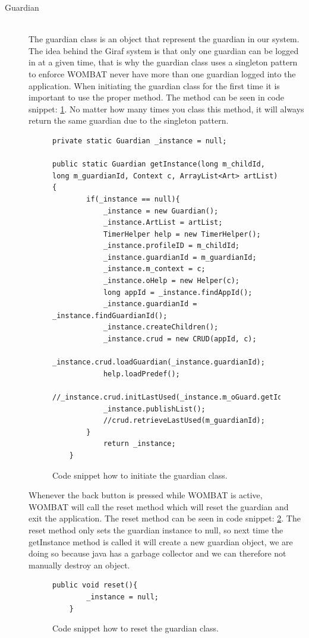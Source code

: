 \begin{description}
  \item[Guardian] \hfill \\
  The guardian class is an object that represent the guardian in our system. The idea behind the Giraf system is that only one guardian can be logged in at a given time, that is why the guardian class uses a singleton pattern to enforce WOMBAT never have more than one guardian logged into the application. When initiating the guardian class for the first time it is important to use the proper method. The method can be seen in code snippet: \ref{code:guardianinit}. No matter how many times you class this method, it will always return the same guardian due to the singleton pattern.
	
	\begin{figure}[H]
\begin{lstlisting}
private static Guardian _instance = null;

public static Guardian getInstance(long m_childId, long m_guardianId, Context c, ArrayList<Art> artList){
		if(_instance == null){
			_instance = new Guardian();
			_instance.ArtList = artList;
			TimerHelper help = new TimerHelper();
			_instance.profileID = m_childId;
			_instance.guardianId = m_guardianId;
			_instance.m_context = c;
			_instance.oHelp = new Helper(c);
			long appId = _instance.findAppId();
			_instance.guardianId = _instance.findGuardianId();
			_instance.createChildren();
			_instance.crud = new CRUD(appId, c);
			_instance.crud.loadGuardian(_instance.guardianId);
			help.loadPredef();
			//_instance.crud.initLastUsed(_instance.m_oGuard.getId());
			_instance.publishList();			
			//crud.retrieveLastUsed(m_guardianId);
		}
			return _instance;
	}
\end{lstlisting}
\caption{Code snippet how to initiate the guardian class.}%
\label{code:guardianinit}%
\end{figure}

Whenever the back button is pressed while WOMBAT is active, WOMBAT will call the reset method which will reset the guardian and exit the application. The reset method can be seen in code snippet: \ref{code:guardianreset}. The reset method only sets the guardian instance to null, so next time the getInstance method is called it will create a new guardian object, we are doing so because java has a garbage collector and we can therefore not manually destroy an object.
	
\begin{figure}[H]
\begin{lstlisting}
public void reset(){
		_instance = null;
	}
\end{lstlisting}
\caption{Code snippet how to reset the guardian class.}%
\label{code:guardianreset}%
\end{figure}


\end{description}
